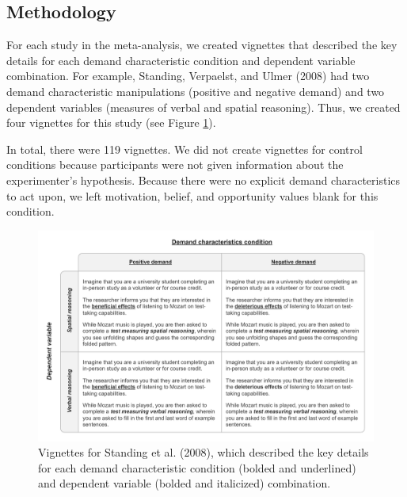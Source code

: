 \documentclass[
  man,floatsintext]{apa6}
\begin{document}
\hypertarget{methodology-1}{%
\subsection{Methodology}\label{methodology-1}}

For each study in the meta-analysis, we created vignettes that described the key details for each demand characteristic condition and dependent variable combination. For example, Standing, Verpaelst, and Ulmer (2008) had two demand characteristic manipulations (positive and negative demand) and two dependent variables (measures of verbal and spatial reasoning). Thus, we created four vignettes for this study (see Figure \ref{fig:vig}).

In total, there were 119 vignettes. We did not create vignettes for control conditions because participants were not given information about the experimenter's hypothesis. Because there were no explicit demand characteristics to act upon, we left motivation, belief, and opportunity values blank for this condition.

\begin{figure}
\includegraphics[width=10.01in]{images/metaware_vigs} \caption{Vignettes for Standing et al. (2008), which described the key details for each demand characteristic condition (bolded and underlined) and dependent variable (bolded and italicized) combination.}\label{fig:vig}
\end{figure}
\end{document}
